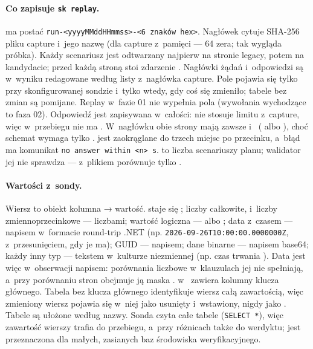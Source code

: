 \paragraph{Co zapisuje \texttt{sk replay}.}  ma postać
\texttt{run-<yyyyMMddHHmmss>-<6 znaków hex>}. Nagłówek cytuje SHA-256 pliku capture i~jego
nazwę (dla capture z~pamięci --- 64 zera; tak wygląda próbka). Każdy scenariusz jest
odtwarzany najpierw na stronie legacy, potem na kandydacie; przed każdą stroną stoi zdarzenie
. Nagłówki żądań i~odpowiedzi są w~wyniku redagowane według listy z~nagłówka capture. Pole  pojawia się tylko przy skonfigurowanej sondzie i~tylko
wtedy, gdy coś się zmieniło; tabele bez zmian są pomijane. Replay w~fazie 01 nie wypełnia pola
 (wywołania wychodzące to faza 02). Odpowiedź jest zapisywana w~całości:
 nie stosuje limitu  z~capture, więc w~przebiegu nie
ma . W~nagłówku obie strony mają zawsze  i~
( albo ), choć schemat wymaga tylko
.  jest zaokrąglane do trzech miejsc po przecinku,
a~błąd  ma komunikat \texttt{no answer within <n> s}.
 to liczba scenariuszy planu; walidator jej nie sprawdza ---
z~plikiem porównuje tylko .

\paragraph{Wartości z~sondy.} Wiersz to obiekt kolumna → wartość.  staje się
; liczby całkowite,  i~liczby zmiennoprzecinkowe --- liczbami;
wartość logiczna ---  albo ; data z~czasem --- napisem
w~formacie round-trip .NET (np. \texttt{2026-09-26T10:00:00.0000000Z}, z~przesunięciem, gdy je
ma); GUID --- napisem; dane binarne --- napisem base64; każdy inny typ --- tekstem w~kulturze
niezmiennej (np. czas trwania ). Data jest więc w~obserwacji napisem:
porównania liczbowe w~klauzulach jej nie spełniają, a~przy porównaniu stron obejmuje ją maska
.  w~ zawiera kolumny klucza głównego.
Tabela bez klucza głównego identyfikuje wiersz całą zawartością, więc zmieniony wiersz pojawia
się w~niej jako usunięty i~wstawiony, nigdy jako . Tabele są ułożone według
nazwy. Sonda czyta całe tabele (\texttt{SELECT *}), więc zawartość wierszy trafia do przebiegu,
a~przy różnicach także do werdyktu; jest przeznaczona dla małych, zasianych baz środowiska
weryfikacyjnego.


